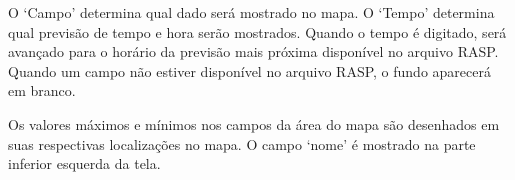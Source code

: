 O ‘Campo’ determina qual dado será mostrado no mapa.  O ‘Tempo’ determina qual previsão de tempo e hora serão mostrados.  Quando o tempo é digitado, será avançado para o horário da previsão mais próxima disponível no arquivo RASP.  Quando um campo não estiver disponível no arquivo RASP, o fundo aparecerá em branco.

Os valores máximos e mínimos nos campos da área do mapa são desenhados 
em suas respectivas localizações no mapa.  O campo ‘nome’ é mostrado na parte inferior esquerda da tela.

